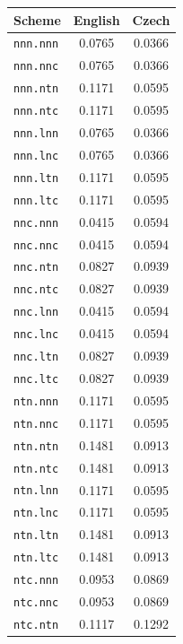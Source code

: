\documentclass[a4paper, 12pt]{article}
\begin{document}
\begin{table}[H]
    \centering
    \begin{tabular}[t]{p{3cm}cc} 
        \hline
        \textbf{Scheme} & \textbf{English} & \textbf{Czech} \\ 
        \hline
        \texttt{nnn.nnn} & 0.0765 & 0.0366 \\
        \texttt{nnn.nnc} & 0.0765 & 0.0366 \\
        \texttt{nnn.ntn} & 0.1171 & 0.0595 \\
        \texttt{nnn.ntc} & 0.1171 & 0.0595 \\
        \texttt{nnn.lnn} & 0.0765 & 0.0366 \\
        \texttt{nnn.lnc} & 0.0765 & 0.0366 \\
        \texttt{nnn.ltn} & 0.1171 & 0.0595 \\
        \texttt{nnn.ltc} & 0.1171 & 0.0595 \\
        \texttt{nnc.nnn} & 0.0415 & 0.0594 \\
        \texttt{nnc.nnc} & 0.0415 & 0.0594 \\
        \texttt{nnc.ntn} & 0.0827 & 0.0939 \\
        \texttt{nnc.ntc} & 0.0827 & 0.0939 \\
        \texttt{nnc.lnn} & 0.0415 & 0.0594 \\
        \texttt{nnc.lnc} & 0.0415 & 0.0594 \\
        \texttt{nnc.ltn} & 0.0827 & 0.0939 \\
        \texttt{nnc.ltc} & 0.0827 & 0.0939 \\
        \texttt{ntn.nnn} & 0.1171 & 0.0595 \\
        \texttt{ntn.nnc} & 0.1171 & 0.0595 \\
        \texttt{ntn.ntn} & 0.1481 & 0.0913 \\
        \texttt{ntn.ntc} & 0.1481 & 0.0913 \\
        \texttt{ntn.lnn} & 0.1171 & 0.0595 \\
        \texttt{ntn.lnc} & 0.1171 & 0.0595 \\
        \texttt{ntn.ltn} & 0.1481 & 0.0913 \\
        \texttt{ntn.ltc} & 0.1481 & 0.0913 \\
        \texttt{ntc.nnn} & 0.0953 & 0.0869 \\
        \texttt{ntc.nnc} & 0.0953 & 0.0869 \\
        \texttt{ntc.ntn} & 0.1117 & 0.1292 \\

\end{tabular}
\end{table}
\end{document}
